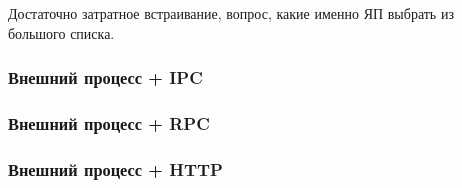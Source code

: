 Достаточно затратное встраивание, вопрос, какие именно ЯП выбрать из
большого списка.

\subsubsection{Внешний процесс + IPC}

\subsubsection{Внешний процесс + RPC}

\subsubsection{Внешний процесс + HTTP}





